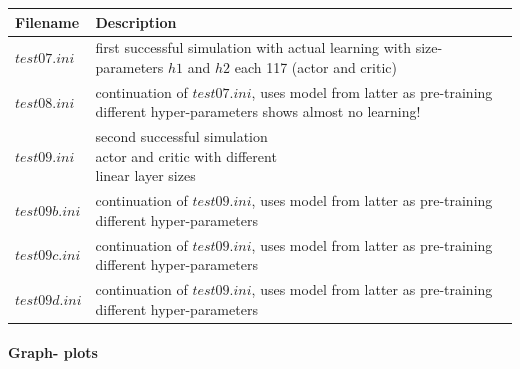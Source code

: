 \documentclass[a4paper]{article}
\begin{document}
\begin{tabular}{ |l|l| }
  \hline
Filename & Description \\
  \hline
$test07.ini$ & \makecell[tl]{first successful simulation with actual learning \\ with size- parameters $h1$ and $h2$ each 117 \\ (actor and critic)} \\
$test08.ini$ & \makecell[tl]{continuation of $test07.ini$, uses model \\ from latter as pre-training \\ different hyper-parameters \\ shows almost no learning!} \\
$test09.ini$ & \makecell[tl]{second successful simulation \\ actor and critic with different \\ linear layer sizes } \\
$test09b.ini$ & \makecell[tl]{continuation of $test09.ini$, uses model \\ from latter as pre-training \\ different hyper-parameters} \\
$test09c.ini$ & \makecell[tl]{continuation of $test09.ini$, uses model \\ from latter as pre-training \\ different hyper-parameters} \\
$test09d.ini$ & \makecell[tl]{continuation of $test09.ini$, uses model \\ from latter as pre-training \\ different hyper-parameters} \\
  \hline
\end{tabular}

\paragraph{Graph- plots}
\end{document}
